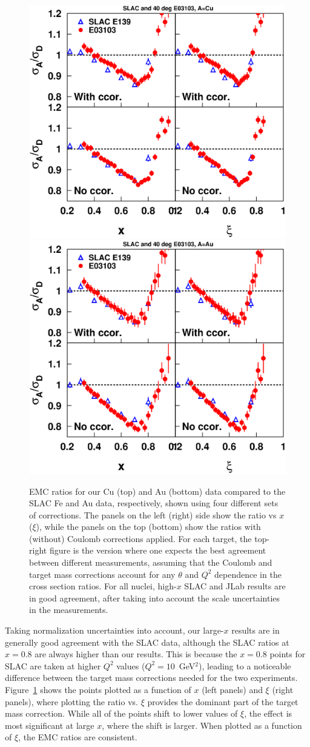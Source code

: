 \begin{figure}[htbp]
\begin{center}
\includegraphics[width=.46\textwidth]{plots/e03103_slac_cu_2by2zone.eps}
\includegraphics[width=.46\textwidth]{plots/e03103_slac_au_2by2zone.eps}
\caption{EMC ratios for our Cu (top) and Au (bottom) data compared to the
SLAC Fe and Au data, respectively, shown using four different sets of
corrections.  The panels on the left (right) side show the ratio vs $x$
($\xi$), while the panels on the top (bottom) show the ratios with (without)
Coulomb corrections applied. For each target, the top-right figure is the
version where one expects the best agreement between different measurements,
assuming that the Coulomb and target mass corrections account for any $\theta$
and $Q^2$ dependence in the cross section ratios.  For all nuclei, high-$x$
SLAC and JLab results are in good agreement, after taking into account the 
scale uncertainties in the measurements.
\label{emc_slac_2by2zone_cu_fig}}
\end{center}
\end{figure}

Taking normalization uncertainties into account, our large-$x$ results are in
generally good agreement with the SLAC data, although the SLAC ratios at
$x=0.8$ are always higher than our results.  This is because the $x=0.8$
points for SLAC are taken at higher $Q^2$ values ($Q^2=10$~GeV$^2$), leading
to a noticeable difference between the target mass corrections needed for the
two experiments. Figure~\ref{emc_slac_2by2zone_cu_fig} shows the points
plotted as a function of $x$ (left panels) and $\xi$ (right panels), where
plotting the ratio vs. $\xi$ provides the dominant part of the target mass
correction. While all of the points shift to lower values of $\xi$, the effect
is most significant at large $x$, where the shift is larger.  When plotted as
a function of $\xi$, the EMC ratios are consistent.

